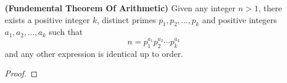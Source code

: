 \guard




\begin{thm}
\label{thm:fundementalTheoremOfArithmetic}
  \textbf{(Fundemental Theorem Of Arithmetic)}
  Given any integer $n>1$, there exists a positive integer $k$, distinct primes $p_1,p_2,\dots,p_k$ and positive integers $a_1,a_2,\dots,a_k$ such that \[ n=p_1^{a_1}p_2^{a_2}\cdots p_k^{a_k}\] and any other expression is identical up to order.
\end{thm}
\begin{proof}

\end{proof}
